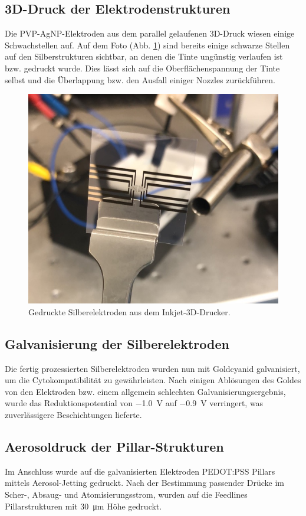  \subsection{3D-Druck der Elektrodenstrukturen}
 Die PVP-AgNP-Elektroden aus dem parallel gelaufenen 3D-Druck wiesen einige Schwachstellen auf.  Auf dem Foto (Abb. \ref{fig:inkjet}) sind bereits einige schwarze Stellen auf den Silberstrukturen sichtbar, an denen die Tinte ungünstig verlaufen ist bzw. gedruckt wurde. Dies lässt sich auf die Oberflächenspannung der Tinte selbst und die Überlappung bzw. den Ausfall einiger Nozzles zurückführen. 
 \begin{figure}[!htb]
     \centering
     \includegraphics [trim=100 200 200 100,clip,width=.5\linewidth]{img/inkjet_chip.jpeg}
     \caption{Gedruckte Silberelektroden aus dem Inkjet-3D-Drucker.}
     \label{fig:inkjet}
 \end{figure}

\subsection{Galvanisierung der Silberelektroden}
Die fertig prozessierten Silberelektroden wurden nun mit Goldcyanid galvanisiert, um die Cytokompatibilität zu gewährleisten. Nach einigen Ablösungen des Goldes von den Elektroden bzw. einem allgemein schlechten Galvanisierungsergebnis, wurde das  Reduktionspotential von \SI{-1.0}{\volt} auf \SI{-0.9}{\volt} verringert, was zuverlässigere Beschichtungen lieferte.

\subsection{Aerosoldruck der Pillar-Strukturen}
Im Anschluss wurde auf die galvanisierten Elektroden PEDOT:PSS Pillars mittels Aerosol-Jetting gedruckt. Nach der Bestimmung passender Drücke im Scher-, Absaug- und Atomisierungsstrom, wurden auf die Feedlines Pillarstrukturen mit \SI{30}{\micro\meter} Höhe gedruckt.